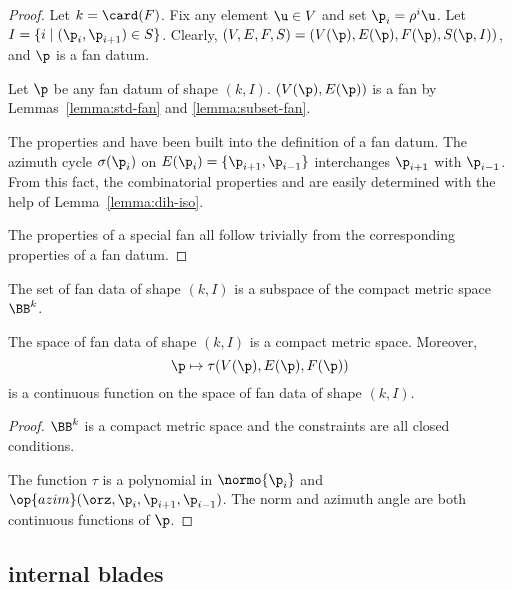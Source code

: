 \begin{proof}
  Let $k=\card(F)$.  Fix any element $\u\in V$ and
set $\p_i = \rho^i \u$.  Let $I = \{i\mid (\p_i,\p_{i+1}) \in S\}$.
Clearly, $(V,E,F,S)=(V(\p),E(\p),F(\p),S(\p,I))$, and $\p$ is a fan
datum.

Let $\p$ be any fan datum of shape $(k,I)$.
$(V(\p),E(\p))$
is a fan by Lemmas~\ref{lemma:std-fan} and \ref{lemma:subset-fan}.


 The properties
 and  have been built into the definition of a
fan datum.  The azimuth cycle $\sigma(\p_i)$ on $E(\p_i) =
\{\p_{i+1},\p_{i-1}\}$ interchanges $\p_{i+1}$ with $\p_{i-1}$.  From
this fact, the combinatorial properties  and
 are easily determined with the help of
Lemma~\ref{lemma:dih-iso}.

 The properties
of a special fan all follow trivially from the corresponding
properties of a fan datum.
\end{proof}

The set of fan data of shape $(k,I)$ is a subspace of the compact metric
space $\BB^k$.


\begin{lemma}\label{lemma:compact-fan}
The space of fan data of shape $(k,I)$ is a compact metric space.
Moreover,
\[ 
\p \mapsto \tau(V(\p),E(\p),F(\p))
\] 
is a continuous function on the space of fan data of shape $(k,I)$.
\end{lemma}

\begin{proof} $\BB^k$ is a compact metric space and the constraints
are all closed conditions.

The function $\tau$ is a polynomial in $\normo{\p_i}$ and
$\op{azim}(\orz,\p_i,\p_{i+1},\p_{i-1})$.  The norm and azimuth
angle are both continuous functions of $\p$.
\end{proof}




\subsection{internal blades}


